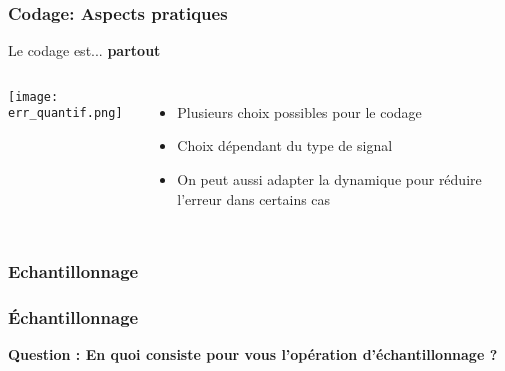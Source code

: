 \documentclass{beamer}
\begin{document}
\begin{frame}
\frametitle{Codage: Aspects pratiques}
Le codage est... \textbf{partout}\\
\begin{columns}
\column{60mm}
\texttt{[image: err\_quantif.png]}\\
\column{60mm}
\begin{itemize}
\item Plusieurs choix possibles pour le codage
\vspace{0.1cm}
\item Choix dépendant du type de signal
\vspace{0.1cm}
\item On peut aussi adapter la dynamique pour réduire l'erreur dans certains cas
\end{itemize}
\end{columns}
\end{frame}


\subsubsection{Echantillonnage} 
\begin{frame} 
\frametitle{\'Echantillonnage} 

\textbf{Question : En quoi consiste pour vous l'opération d'échantillonnage ?}\\
\vspace{0.5cm}
\end{frame}
\end{document}
